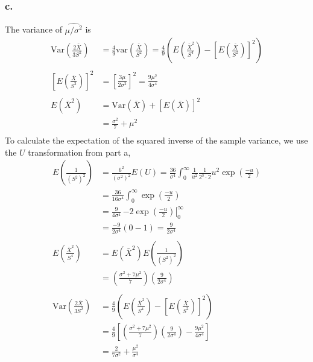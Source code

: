 \documentclass{article}
\begin{document}
\subsubsection*{c.}
The variance of $\widehat{\mu/\sigma^2}$ is 
\begin{align*}
\mathrm{Var}\left(\frac{2\bar{X}}{3S^2}\right) &= \frac{4}{9}\mathrm{var}\left(\frac{\bar{X}}{S^2}\right) = \frac{4}{9}\left(E\left(\frac{\bar{X}^2}{S^4}\right) - \left[E\left(\frac{\bar{X}}{S^2}\right)\right]^2\right) \\ \\
\left[E\left(\frac{\bar{X}}{S^2}\right)\right]^2 &= \left[\frac{3\mu}{2\sigma^2}\right]^2 = \frac{9\mu^2}{4\sigma^4} \\ \\
E(\bar{X}^2) &= \mathrm{Var}(\bar{X}) + \left[E(\bar{X})\right]^2 \\
&=\frac{\sigma^2}{7} + \mu^2 \\
\end{align*}
To calculate the expectation of the squared inverse of the sample variance, we use the $U$ transformation from part a,
\begin{align*}
E\left(\frac{1}{\left(S^2\right)^2}\right) &= \frac{6^2}{(\sigma^2)^2}E(U) = \frac{36}{\sigma^4}\int_0^\infty\frac{1}{u^2}\frac{1}{2^3\cdot2}u^2\exp\left(\frac{-u}{2}\right) \\
&=\frac{36}{16\sigma^4}\int_0^\infty\exp\left(\frac{-u}{2}\right) \\
&=\frac{9}{4\sigma^4}\,\left.-2\exp\left(\frac{-u}{2}\right)\right|_0^\infty \\
&=\frac{-9}{2\sigma^4}\left(0-1\right) = \frac{9}{2\sigma^4} \\ \\
E\left(\frac{\bar{X}^2}{S^4}\right) &= E(\bar{X}^2)E\left(\frac{1}{\left(S^2\right)^2}\right)\\
&=  \left(\frac{\sigma^2+7\mu^2}{7}\right)\left(\frac{9}{2\sigma^4}\right) \\ \\
\mathrm{Var}\left(\frac{2\bar{X}}{3S^2}\right) &= \frac{4}{9}\left(E\left(\frac{\bar{X}^2}{S^4}\right) - \left[E\left(\frac{\bar{X}}{S^2}\right)\right]^2\right) \\
&=\frac{4}{9}\left[\left(\frac{\sigma^2+7\mu^2}{7}\right)\left(\frac{9}{2\sigma^4}\right) - \frac{9\mu^2}{4\sigma^4}\right] \\
&= \frac{2}{7\sigma^2}+\frac{\mu^2}{\sigma^4}
\end{align*}
\end{document}
